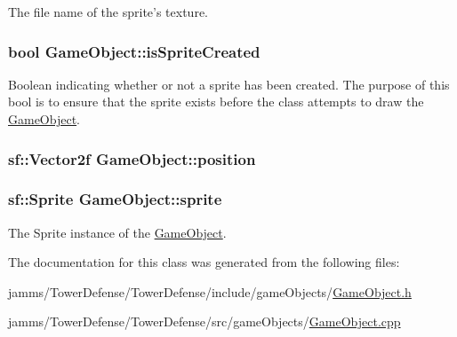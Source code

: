 The file name of the sprite's texture. 

\hypertarget{class_game_object_a677286bcb906871b6a3eb0c0b9342176}{
\subsubsection[{is\+Sprite\+Created}]{\setlength{\rightskip}{0pt plus 5cm}bool Game\+Object\+::is\+Sprite\+Created\hspace{0.3cm}{\ttfamily [protected]}}}\label{class_game_object_a677286bcb906871b6a3eb0c0b9342176}


Boolean indicating whether or not a sprite has been created. The purpose of this bool is to ensure that the sprite exists before the class attempts to draw the \hyperlink{class_game_object}{Game\+Object}. 

\hypertarget{class_game_object_a86e4253e3734436b4a5a0c503e0033b4}{
\subsubsection[{position}]{\setlength{\rightskip}{0pt plus 5cm}sf\+::\+Vector2f Game\+Object\+::position\hspace{0.3cm}{\ttfamily [protected]}}}\label{class_game_object_a86e4253e3734436b4a5a0c503e0033b4}
\hypertarget{class_game_object_abb3608f1c76edd590e023585c2216f02}{
\subsubsection[{sprite}]{\setlength{\rightskip}{0pt plus 5cm}sf\+::\+Sprite Game\+Object\+::sprite\hspace{0.3cm}{\ttfamily [protected]}}}\label{class_game_object_abb3608f1c76edd590e023585c2216f02}


The Sprite instance of the \hyperlink{class_game_object}{Game\+Object}. 



The documentation for this class was generated from the following files\+:\begin{DoxyCompactItemize}
\item 
jamms/\+Tower\+Defense/\+Tower\+Defense/include/game\+Objects/\hyperlink{_game_object_8h}{Game\+Object.\+h}\item 
jamms/\+Tower\+Defense/\+Tower\+Defense/src/game\+Objects/\hyperlink{_game_object_8cpp}{Game\+Object.\+cpp}\end{DoxyCompactItemize}
